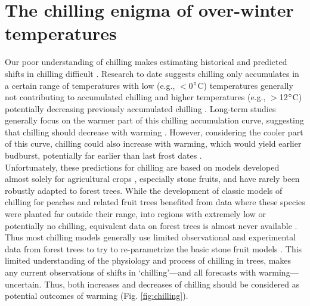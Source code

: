 \documentclass[11pt]{article}
\begin{document}
\section{The chilling enigma of over-winter temperatures}
Our poor understanding of chilling makes estimating historical and predicted shifts in chilling difficult \citep{chuine2016}. Research to date suggests chilling only accumulates in a certain range of temperatures with low (e.g., $<$0$\degree$C) temperatures generally not contributing to accumulated chilling and higher temperatures (e.g., $>$12$\degree$C) potentially decreasing previously accumulated chilling \citep[see Fig. \ref{fig:chilling} and][]{richardson1974,fishman1987}. Long-term studies generally focus on the warmer part of this chilling accumulation curve, suggesting that chilling should decrease with warming \citep{fu2015,piao2017,gauzere2019}.  However, considering the cooler part of this curve, chilling could also increase with warming, which would yield earlier budburst, potentially far earlier than last frost dates \citep[][]{guy2014}. \\

Unfortunately, these predictions for chilling are based on models developed almost solely for agricultural crops \citep[but see][]{harrington2015}, especially stone fruits, and have rarely been robustly adapted to forest trees. While the development of classic models of chilling for peaches and related fruit trees benefited from data where these species were planted far outside their range, into regions with extremely low or potentially no chilling, equivalent data on forest trees is almost never available \citep{dennis2003}. Thus most chilling models generally use limited observational and experimental data from forest trees to try to re-parametrize the basic stone fruit models \citep{Chuine2000,chuine2016}. This limited understanding of the physiology and process of chilling in trees, makes any current observations of shifts in `chilling'---and all forecasts with warming---uncertain. Thus, both increases and decreases of chilling should be considered as potential outcomes of warming (Fig. \ref{fig:chilling}). \\
\end{document}
